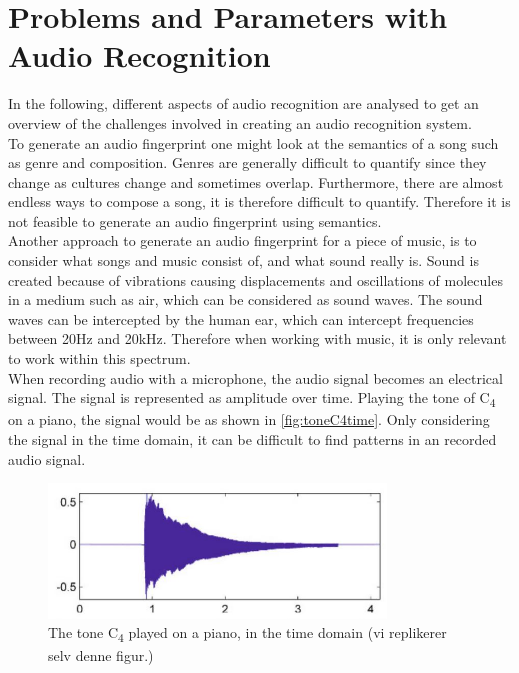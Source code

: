 \section{Problems and Parameters with Audio Recognition}
In the following, different aspects of audio recognition are analysed to get an overview of the challenges involved in creating an audio recognition system.\\
\indent To generate an audio fingerprint one might look at the semantics of a song such as genre and composition. Genres are generally difficult to quantify since they change as cultures change and sometimes overlap. Furthermore, there are almost endless ways to compose a song, it is therefore difficult to quantify. Therefore it is not feasible to generate an audio fingerprint using semantics. \cite{haitsma2003highly}\\
Another approach to generate an audio fingerprint for a piece of music, is to consider what songs and music consist of, and what sound really is.
Sound is created because of vibrations causing displacements and oscillations of molecules in a medium such as air, which can be considered as sound waves. The sound waves can be intercepted by the human ear, which can intercept frequencies between 20Hz and 20kHz. Therefore when working with music, it is only relevant to work within this spectrum. \cite[21]{Meinard2015Fundamentals}\\

When recording audio with a microphone, the audio signal becomes an electrical signal. The signal is represented as amplitude over time. Playing the tone of C\textsubscript{4} on a piano, the signal would be as shown in \autoref{fig:toneC4time}. Only considering the signal in the time domain, it can be difficult to find patterns in an recorded audio signal. 

\begin{figure}[H]
    \centering
    \includegraphics[width=0.8\textwidth]{figures/toneC4time.JPG}
    \caption{The tone C\textsubscript{4} played on a piano, in the time domain (vi replikerer selv denne figur.)}
    \label{fig:toneC4time}
\end{figure}

